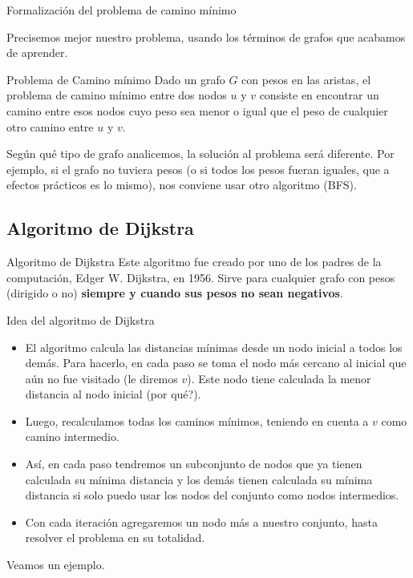 \documentclass[compress]{beamer}
\begin{document}
\begin{frame}{Formalización del problema de camino mínimo}

Precisemos mejor nuestro problema, usando los términos de grafos que
acabamos de aprender.

\begin{block}{Problema de Camino m\'inimo}
Dado un grafo $G$ con pesos en las aristas, el problema de
camino mínimo entre dos nodos $u$ y $v$ consiste en encontrar un camino
entre esos nodos cuyo peso sea menor o igual que el peso de cualquier
otro camino entre $u$ y $v$.
\end{block}

\bigskip

Según qué tipo de grafo analicemos, la solución al problema será diferente.
Por ejemplo, si el grafo no tuviera pesos (o si todos los pesos fueran iguales,
que a efectos prácticos es lo mismo), nos conviene usar otro algoritmo (BFS).

\end{frame}

\subsection{Algoritmo de Dijkstra}
\begin{frame}{Algoritmo de Dijkstra}
Este algoritmo fue creado por uno de los padres de la computación,
Edger W. Dijkstra, en 1956. Sirve para cualquier grafo con pesos (dirigido
o no) \textbf{siempre y cuando sus pesos no sean negativos}.

\end{frame}

\begin{frame}{Idea del algoritmo de Dijkstra}
\begin{itemize}
\item El algoritmo calcula las distancias mínimas desde un nodo inicial a todos 
los demás. Para hacerlo, en cada paso se toma el nodo más cercano al inicial
que aún no fue visitado (le diremos $v$). Este nodo tiene calculada la menor distancia
al nodo inicial (\textquestiondown por qué?). 
\item Luego, recalculamos todas los caminos mínimos, teniendo en cuenta a 
$v$ como camino intermedio.
\item Así, en cada paso tendremos un subconjunto de nodos que ya tienen calculada
su mínima distancia y los demás tienen calculada su mínima distancia si solo
puedo usar los nodos del conjunto como nodos intermedios. 
\item Con cada iteración agregaremos un nodo más a nuestro conjunto, hasta resolver el 
problema en su totalidad.
\end{itemize}

Veamos un ejemplo.
\end{frame}
\end{document}
